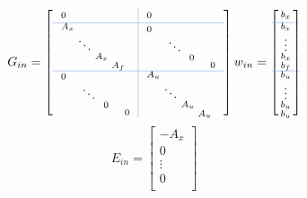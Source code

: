 \[
	G_{in} =
	\left[
		\begin{array}{l!{\color{RoyalBlue!50}\vrule}l}
			\noalign{\arrayrulewidth=0.1mm}\arrayrulecolor{RoyalBlue!50}
			\begin{smallmatrix}
				0&&&
			\end{smallmatrix}
			 &
			\begin{smallmatrix}
				0&&&
			\end{smallmatrix}
			\\ \hline
			\begin{smallmatrix}
				A_x&&&\\
				&\ddots&\\
				&&		A_x&\\
				&&&		A_f
			\end{smallmatrix}
			 &
			\begin{smallmatrix}
				0\ \ &&&\\
				&\ \ddots\\
				&&\ 0\ &\\
				&&&\ \ 0
			\end{smallmatrix}
			\\ \hline
			\begin{smallmatrix}
				0\ \ &&&\\
				&\ \ddots\\
				&&\ 0\ &\\
				&&&\ \ 0
			\end{smallmatrix}
			 &
			\begin{smallmatrix}
				A_u&&\\
				&\ddots&\\
				&&A_u&\\
				&&&A_u
			\end{smallmatrix}
		\end{array}
		\right]
	w_{in} =
	\begin{bmatrix}
		\noalign{\arrayrulewidth=0.1mm}\arrayrulecolor{RoyalBlue!50}
		\begin{smallmatrix}
			b_x\\
		\end{smallmatrix}
		\\ \hline
		\begin{smallmatrix}
			b_x\\
			\vdots\\
			b_x\\
			b_f\\
		\end{smallmatrix}
		\\ \hline
		\begin{smallmatrix}
			b_u\\
			\vdots\\
			b_u\\
			b_u\\
		\end{smallmatrix}
	\end{bmatrix}
\]
\[
	E_{in} =
	\left[
		\begin{smallmatrix}
			-A_x \\
			0 \\
			\vdots \\
			0 \\
		\end{smallmatrix}
		\right]
\]

